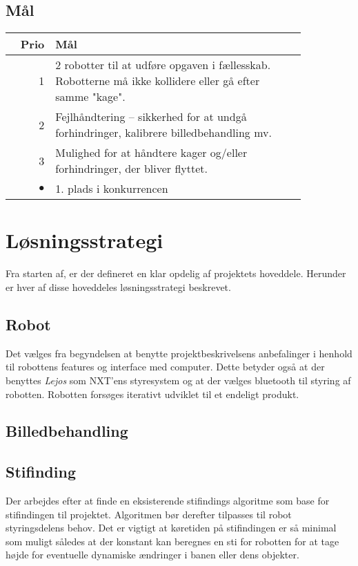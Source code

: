 \subsection{Mål}
\begin{tabular}{r p{0.85\linewidth}}
	\textbf{Prio} & \textbf{Mål} \\
	\hline
	1 & 2 robotter til at udføre opgaven i fællesskab. Robotterne må ikke kollidere eller gå efter samme "kage".\\
	2 & Fejlhåndtering -- sikkerhed for at undgå forhindringer, kalibrere billedbehandling mv.\\
	3 & Mulighed for at håndtere kager og/eller forhindringer, der bliver flyttet. \\
	$\bullet$ & 1. plads i konkurrencen
\end{tabular}

\section{Løsningsstrategi}
Fra starten af, er der defineret en klar opdelig af projektets hoveddele. Herunder er hver af disse hoveddeles løsningsstrategi beskrevet.

\subsection{Robot}
Det vælges fra begyndelsen at benytte projektbeskrivelsens anbefalinger i henhold til robottens features og interface med computer.
Dette betyder også at der benyttes \textit{Lejos} som NXT'ens styresystem og at der vælges bluetooth til styring af robotten.
Robotten forsøges iterativt udviklet til et endeligt produkt.

\subsection{Billedbehandling}

\subsection{Stifinding}
Der arbejdes efter at finde en eksisterende stifindings algoritme som base for stifindingen til projektet. Algoritmen bør derefter tilpasses til robot styringsdelens behov.
Det er vigtigt at køretiden på stifindingen er så minimal som muligt således at der konstant kan beregnes en sti for robotten for at tage højde for eventuelle dynamiske ændringer i banen eller dens objekter.